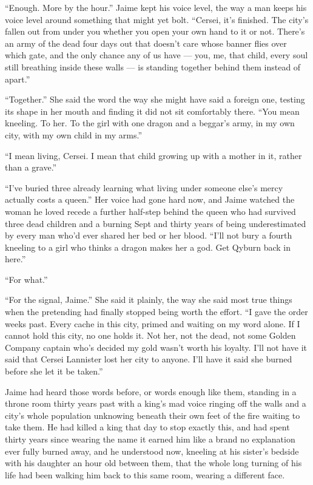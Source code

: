 “Enough. More by the hour.” Jaime kept his voice level, the way a man keeps his voice level around something that might yet bolt. “Cersei, it’s finished. The city’s fallen out from under you whether you open your own hand to it or not. There’s an army of the dead four days out that doesn’t care whose banner flies over which gate, and the only chance any of us have — you, me, that child, every soul still breathing inside these walls — is standing together behind them instead of apart.”

“Together.” She said the word the way she might have said a foreign one, testing its shape in her mouth and finding it did not sit comfortably there. “You mean kneeling. To her. To the girl with one dragon and a beggar’s army, in my own city, with my own child in my arms.”

“I mean living, Cersei. I mean that child growing up with a mother in it, rather than a grave.”

“I’ve buried three already learning what living under someone else’s mercy actually costs a queen.” Her voice had gone hard now, and Jaime watched the woman he loved recede a further half-step behind the queen who had survived three dead children and a burning Sept and thirty years of being underestimated by every man who’d ever shared her bed or her blood. “I’ll not bury a fourth kneeling to a girl who thinks a dragon makes her a god. Get Qyburn back in here.”

“For what.”

“For the signal, Jaime.” She said it plainly, the way she said most true things when the pretending had finally stopped being worth the effort. “I gave the order weeks past. Every cache in this city, primed and waiting on my word alone. If I cannot hold this city, no one holds it. Not her, not the dead, not some Golden Company captain who’s decided my gold wasn’t worth his loyalty. I’ll not have it said that Cersei Lannister lost her city to anyone. I’ll have it said she burned before she let it be taken.”

\sceneBreak

Jaime had heard those words before, or words enough like them, standing in a throne room thirty years past with a king’s mad voice ringing off the walls and a city’s whole population unknowing beneath their own feet of the fire waiting to take them. He had killed a king that day to stop exactly this, and had spent thirty years since wearing the name it earned him like a brand no explanation ever fully burned away, and he understood now, kneeling at his sister’s bedside with his daughter an hour old between them, that the whole long turning of his life had been walking him back to this same room, wearing a different face.

